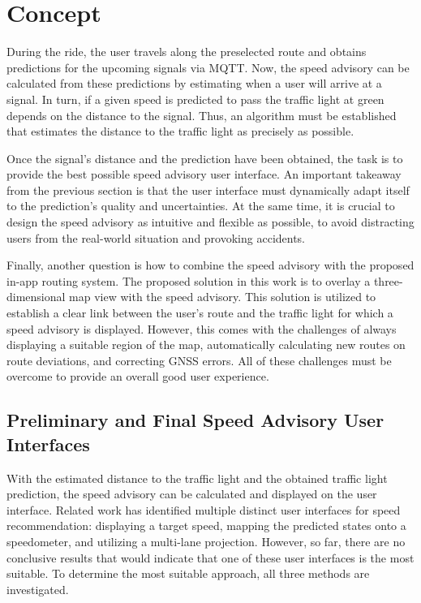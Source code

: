 \section{Concept}

During the ride, the user travels along the preselected route and obtains predictions for the upcoming signals via MQTT. Now, the speed advisory can be calculated from these predictions by estimating when a user will arrive at a signal. In turn, if a given speed is predicted to pass the traffic light at green depends on the distance to the signal. Thus, an algorithm must be established that estimates the distance to the traffic light as precisely as possible.

Once the signal's distance and the prediction have been obtained, the task is to provide the best possible speed advisory user interface. An important takeaway from the previous section is that the user interface must dynamically adapt itself to the prediction's quality and uncertainties. At the same time, it is crucial to design the speed advisory as intuitive and flexible as possible, to avoid distracting users from the real-world situation and provoking accidents.

Finally, another question is how to combine the speed advisory with the proposed in-app routing system. The proposed solution in this work is to overlay a three-dimensional map view with the speed advisory. This solution is utilized to establish a clear link between the user's route and the traffic light for which a speed advisory is displayed. However, this comes with the challenges of always displaying a suitable region of the map, automatically calculating new routes on route deviations, and correcting GNSS errors. All of these challenges must be overcome to provide an overall good user experience.

\subsection{Preliminary and Final Speed Advisory User Interfaces}

With the estimated distance to the traffic light and the obtained traffic light prediction, the speed advisory can be calculated and displayed on the user interface. Related work has identified multiple distinct user interfaces for speed recommendation: displaying a target speed, mapping the predicted states onto a speedometer, and utilizing a multi-lane projection. However, so far, there are no conclusive results that would indicate that one of these user interfaces is the most suitable. To determine the most suitable approach, all three methods are investigated.

